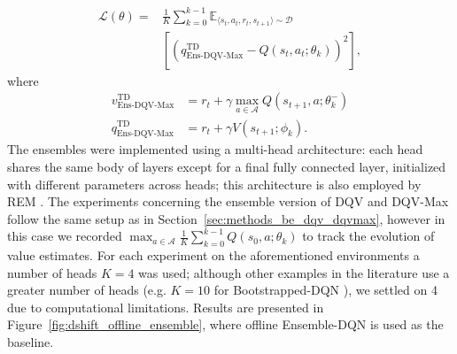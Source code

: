 \begin{equation}
  \begin{aligned}
    \mathcal{L}\left(\theta\right)=&\frac{1}{K}\sum_{k=0}^{k-1}\mathbb{E}_{\langle
                                     s_t,a_t,r_t,s_{t+1}\rangle\sim\mathcal{D}}\\
                                   &\left[{\left(q^{\scriptscriptstyle\textrm{TD}}_{\scriptscriptstyle\textrm{Ens-DQV-Max}}-Q\left(s_t,a_t;\theta_k\right)\right)}^2\right],
  \end{aligned}
\end{equation}
where
\begin{align}
  v^{\scriptscriptstyle
  \textrm{TD}}_{\scriptscriptstyle\textrm{Ens-DQV-Max}}&=r_t+\gamma\max_{a\in\mathcal{A}}Q\left(s_{t+1},a;\theta_k^{-}\right)\\
  q^{\scriptscriptstyle\textrm{TD}}_{\scriptscriptstyle\textrm{Ens-DQV-Max}}&=r_t+\gamma V\left(s_{t+1};\phi_k\right).
\end{align}
The ensembles were implemented using a multi-head architecture: each
head shares the same body of layers except for a final
fully connected layer, initialized with different parameters across
heads; this architecture is also employed by REM
\citep{agarwal2020optimistic}.
The experiments concerning the ensemble version of DQV and DQV-Max
follow the same setup as in Section~\ref{sec:methods_be_dqv_dqvmax},
however in this case we recorded
$\max_{a\in\mathcal{A}}\frac{1}{K}\sum_{k=0}^{k-1}Q\left(s_0,a;\theta_k\right)$
to track the evolution of value estimates.
For each experiment on the aforementioned environments a number of
heads $K=4$ was used; although other examples in the literature use a
greater number of heads (e.g. $K=10$ for Bootstrapped-DQN
\citep{osband2016deep}), we settled on 4 due to computational
limitations. Results are presented in
Figure~\ref{fig:dshift_offline_ensemble}, where offline Ensemble-DQN
is used as the baseline.
